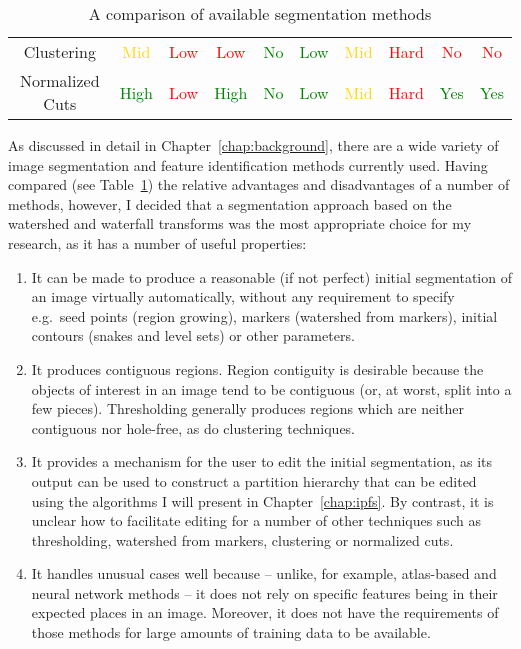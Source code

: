 \begin{table}[p]
\begin{center}
\begin{tabular}{c||c|c|c|c|c|c|c|c|c}
Clustering & \textcolor{gold}{Mid} & \textcolor{red}{Low} & \textcolor{red}{Low} & \textcolor{green}{No} & \textcolor{green}{Low} & \textcolor{gold}{Mid} & \textcolor{red}{Hard} & \textcolor{red}{No} & \textcolor{red}{No} \\
Normalized Cuts & \textcolor{green}{High} & \textcolor{red}{Low} & \textcolor{green}{High} & \textcolor{green}{No} & \textcolor{green}{Low} & \textcolor{gold}{Mid} & \textcolor{red}{Hard} & \textcolor{green}{Yes} & \textcolor{green}{Yes}
\end{tabular}
\end{center}
\caption{A comparison of available segmentation methods}
\label{fig:methodology-methods-comparison}
\end{table}

As discussed in detail in Chapter~\ref{chap:background}, there are a wide variety of image segmentation and feature identification methods currently used. Having compared (see Table~\ref{fig:methodology-methods-comparison}) the relative advantages and disadvantages of a number of methods, however, I decided that a segmentation approach based on the watershed and waterfall transforms was the most appropriate choice for my research, as it has a number of useful properties:
%
\begin{enumerate}

\item It can be made to produce a reasonable (if not perfect) initial segmentation of an image virtually automatically, without any requirement to specify e.g.~seed points (region growing), markers (watershed from markers), initial contours (snakes and level sets) or other parameters.

\item It produces contiguous regions. Region contiguity is desirable because the objects of interest in an image tend to be contiguous (or, at worst, split into a few pieces). Thresholding generally produces regions which are neither contiguous nor hole-free, as do clustering techniques.

\item It provides a mechanism for the user to edit the initial segmentation, as its output can be used to construct a partition hierarchy that can be edited using the algorithms I will present in Chapter~\ref{chap:ipfs}. By contrast, it is unclear how to facilitate editing for a number of other techniques such as thresholding, watershed from markers, clustering or normalized cuts.

\pagebreak[4]

\item It handles unusual cases well because -- unlike, for example, atlas-based and neural network methods -- it does not rely on specific features being in their expected places in an image. Moreover, it does not have the requirements of those methods for large amounts of training data to be available.


\end{enumerate}
